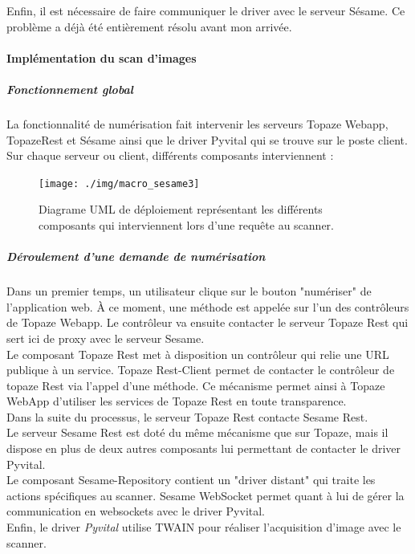 Enfin, il est nécessaire de faire communiquer le driver avec le serveur Sésame. Ce problème a déjà été entièrement résolu avant mon arrivée.

\paragraph*{Implémentation du scan d'images}
\subparagraph*{Fonctionnement global}
La fonctionnalité de numérisation fait intervenir les serveurs Topaze Webapp, TopazeRest et Sésame ainsi que le driver Pyvital qui se trouve sur le poste client.
Sur chaque serveur ou client, différents composants interviennent :
\begin{figure}[H]
  \centering
  \texttt{[image: ./img/macro\_sesame3]}
  \caption{\label{fig:mb_va_ast} Diagrame UML de déploiement représentant les différents composants qui interviennent lors d'une requête au scanner.}
\end{figure}

\subparagraph*{Déroulement d'une demande de numérisation}
Dans un premier temps, un utilisateur clique sur le bouton "numériser" de l'application web. À ce moment, une méthode est appelée sur l'un des contrôleurs de Topaze Webapp. Le contrôleur va ensuite contacter le serveur Topaze Rest qui sert ici de proxy avec le serveur Sesame. \\
Le composant Topaze Rest met à disposition un contrôleur qui relie une URL publique à un service. Topaze Rest-Client permet de contacter le contrôleur de topaze Rest via l'appel d'une méthode. Ce mécanisme permet ainsi à Topaze WebApp d'utiliser les services de Topaze Rest en toute transparence. \\
Dans la suite du processus, le serveur Topaze Rest contacte Sesame Rest. \\
Le serveur Sesame Rest est doté du même mécanisme que sur Topaze, mais il dispose en plus de deux autres composants lui permettant de contacter le driver Pyvital.\\
Le composant Sesame-Repository contient un "driver distant" qui traite les actions spécifiques au scanner. Sesame WebSocket permet quant à lui de gérer la communication en websockets avec le driver Pyvital.\\
Enfin, le driver \textit{Pyvital} utilise TWAIN pour réaliser l'acquisition d'image avec le scanner.\\

